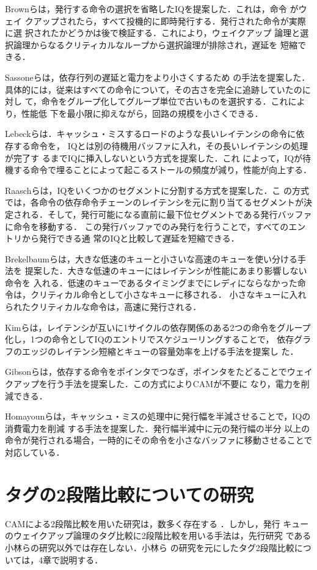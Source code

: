 Brownらは，発行する命令の選択を省略したIQを提案した\cite{brown2001}．これは，命令
がウェイ
クアップされたら，すべて投機的に即時発行する．発行された命令が実際に選
択されたかどうかは後で検証する．これにより，ウェイクアップ
論理と選択論理からなるクリティカルなループから選択論理が排除され，遅延を
短縮できる．

Sassoneらは，依存行列の遅延と電力をより小さくするため
の手法を提案した\cite{sassone2007}．具体的には，従来はすべての命令について，その古さを完全に追跡していたのに対し
て，命令をグループ化してグループ単位で古いものを選択する．これにより，性能低
下を最小限に抑えながら，回路の規模を小さくできる．

Lebeckらは．キャッシュ・ミスするロードのような長いレイテンシの命令に依存する命令を，
IQとは別の待機用バッファに入れ，その長いレイテンシの処理が完了す
るまでIQに挿入しないという方式を提案した\cite{Lebeck2002}．これ
によって，IQが待機する命令で埋ることによって起こるストールの頻度が減り，性能が向上する．

Raaschらは，IQをいくつかのセグメントに分割する方式を提案した\cite{Raasch2002}．こ
の方式では，各命令の依存命令チェーンのレイテンシを元に割り当てるセグメントが決
定される．そして，発行可能になる直前に最下位セグメントである発行バッファに命令を移動する．
この発行バッファでのみ発行を行うことで，すべてのエントリから発行できる通
常のIQと比較して遅延を短縮できる．

Brekelbaumらは，大きな低速のキューと小さいな高速のキューを使い分ける手法を
提案した\cite{brekelbaum2002}．大きな低速のキューにはレイテンシが性能にあまり影響しない命令を
入れる．低速のキューであるタイミングまでにレディにならなかった命令は，クリティカル命令として小さなキューに移される．
小さなキューに入れられたクリティカルな命令は，高速に発行される．

Kimらは，レイテンシが互いに1サイクルの依存関係のある2つの命令をグループ
化し，1つの命令としてIQのエントリでスケジューリングすることで，
依存グラフのエッジのレイテンシ短縮とキューの容量効率を上げる手法を提案し
た\cite{Kim2003}．

Gibsonらは，依存する命令をポインタでつなぎ，ポインタをたどることでウェイ
クアップを行う手法を提案した\cite{Gibson2010}．この方式によりCAMが不要に
なり，電力を削減できる．

Homayounらは，キャッシュ・ミスの処理中に発行幅を半減させることで，IQの消費電力を削減
する手法を提案した\cite{H.Homayoun2011}．発行幅半減中に元の発行幅の半分
以上の命令が発行される場合，一時的にその命令を小さなバッファに移動させることで対応している．

\section{タグの2段階比較についての研究}
CAMによる2段階比較を用いた研究は，数多く存在する
\cite{Zukowski-ISCAS1997}\cite{Pagiamtzis-CAMsurvey2006}\cite{zhang2004}．しかし，発行
キューのウェイクアップ論理のタグ比較に2段階比較を用いる手法は，先行研究
である小林らの研究\cite{kobayashi-thesis}以外では存在しない．小林ら
の研究を元にしたタグ2段階比較については，4章で説明する．
%
%
